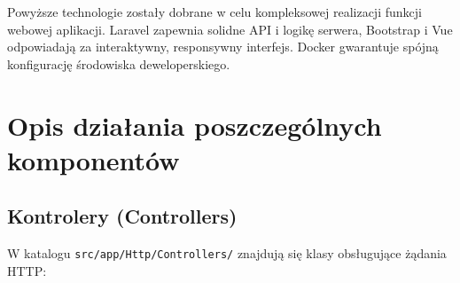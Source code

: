 \documentclass[12pt,a4paper]{article}
\begin{document}
Powyższe technologie zostały dobrane w celu kompleksowej realizacji funkcji webowej aplikacji. Laravel zapewnia solidne API i logikę serwera, Bootstrap i Vue odpowiadają za interaktywny, responsywny interfejs. Docker gwarantuje spójną konfigurację środowiska deweloperskiego.

\newpage

\section{Opis działania poszczególnych komponentów}

\subsection{Kontrolery (Controllers)}

W katalogu \texttt{src/app/Http/Controllers/} znajdują się klasy obsługujące żądania HTTP:
\end{document}
